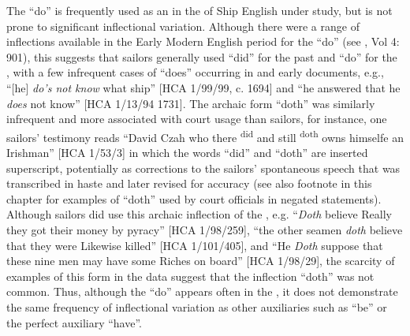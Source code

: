 The  “do” is frequently used as an  in the  of Ship English under study, but is not prone to significant inflectional variation. Although there were a range of inflections available in the Early Modern English period for the  “do” (see \citealt{oed:1989}, Vol 4: 901), this  suggests that sailors generally used “did” for the past and “do” for the , with a few infrequent cases of “does” occurring in  and early  documents, e.g., “[he] \textit{do’s not know} what ship” [HCA 1/99/99, c. 1694] and “he answered that he \textit{does} not know” [HCA 1/13/94 1731]. The archaic form “doth” was similarly infrequent and more associated with court usage than sailors, for instance, one sailors’ testimony reads “David Czah who there \textsuperscript{did} and still \textsuperscript{doth} owns himselfe an Irishman” [HCA 1/53/3] in which the words “did” and “doth” are inserted superscript, potentially as corrections to the sailors’ spontaneous speech that was transcribed in haste and later revised for accuracy (see also footnote in this chapter for examples of “doth” used by court officials in negated statements). Although sailors did use this archaic inflection of the , e.g. “\textit{Doth} believe Really they got their money by pyracy” [HCA 1/98/259], “the other seamen \textit{doth} believe that they were Likewise killed” [HCA 1/101/405], and “He \textit{Doth} suppose that these nine men may have some Riches on board” [HCA 1/98/29], the scarcity of examples of this form in the data suggest that the inflection “doth” was not common. Thus, although the  “do” appears often in the , it does not demonstrate the same frequency of inflectional variation as other auxiliaries such as “be” or the perfect auxiliary “have”. 

